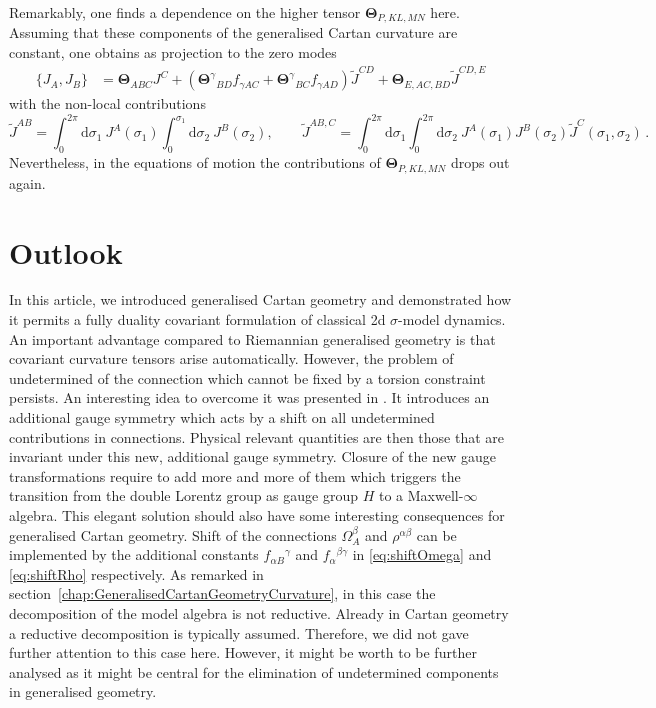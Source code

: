 \documentclass[11pt,a4paper]{article}
\numberwithin{equation}{section}
\begin{document}
Remarkably, one finds a dependence on the higher tensor $\mathbf{\Theta}_{P,KL,MN}$ here. Assuming that these components of the generalised Cartan curvature are constant, one obtains as projection to the zero modes
\begin{align*}
	\{ J_A , J_B \} &= {\mathbf{\Theta}}_{ABC} J^C + ({\mathbf{\Theta}^\gamma}_{BD} f_{\gamma AC} + {\mathbf{\Theta}^\gamma}_{BC} f_{\gamma AD}) \tilde{J}^{CD} + \mathbf{\Theta}_{E,AC,BD} \tilde{J}^{CD,E} 
\end{align*}
with the non-local contributions
\begin{equation}
	\tilde{J}^{AB} = \int_0^{2\pi} \mathrm{d}\sigma_1 \  J^A(\sigma_1) \int^{\sigma_1}_0 \mathrm{d}\sigma_2 \ J^B(\sigma_2), \qquad \tilde{J}^{AB,C} = \int_0^{2\pi} \mathrm{d} \sigma_1 \int_0^{2\pi} \mathrm{d} \sigma_2 \ J^A(\sigma_1) J^B(\sigma_2) \tilde{J}^C (\sigma_1,\sigma_2)\,.
\end{equation}
Nevertheless, in the equations of motion the contributions of $\mathbf{\Theta}_{P,KL,MN}$ drops out again.

\section{Outlook}\label{chap:Outlook}
In this article, we introduced generalised Cartan geometry and demonstrated how it permits a fully duality covariant formulation of classical 2d $\sigma$-model dynamics. An important advantage compared to Riemannian generalised geometry is that covariant curvature tensors arise automatically. However, the problem of undetermined of the connection which cannot be fixed by a torsion constraint persists. An interesting idea to overcome it was presented in \cite{Butter:2021dtu}. It introduces an additional gauge symmetry which acts by a shift on all undetermined contributions in connections. Physical relevant quantities are then those that are invariant under this new, additional gauge symmetry. Closure of the new gauge transformations require to add more and more of them which triggers the transition from the double Lorentz group as gauge group $H$ to a Maxwell-$\infty$ algebra. This elegant solution should also have some interesting consequences for generalised Cartan geometry. Shift of the connections $\Omega^\beta_A$ and $\rho^{\alpha\beta}$ can be implemented by the additional constants $f_{\alpha B}{}^\gamma$ and $f_{\alpha}{}^{\beta\gamma}$ in \eqref{eq:shiftOmega} and \eqref{eq:shiftRho} respectively. As remarked in section~\ref{chap:GeneralisedCartanGeometryCurvature}, in this case the decomposition of the model algebra is not reductive. Already in Cartan geometry a reductive decomposition is typically assumed. Therefore, we did not gave further attention to this case here. However, it might be worth to be further analysed as it might be central for the elimination of undetermined components in generalised geometry.
 
\end{document}
